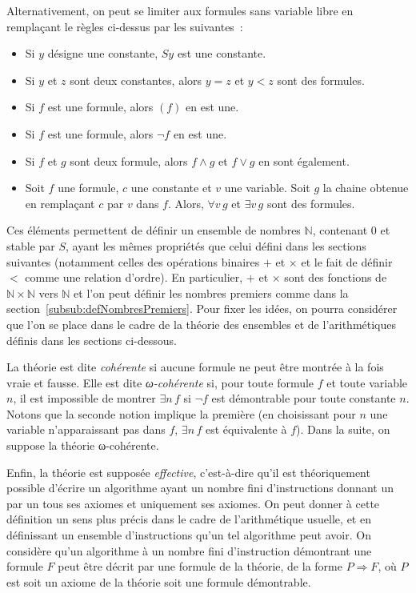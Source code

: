 Alternativement, on peut se limiter aux formules sans variable libre en remplaçant le règles ci-dessus par les suivantes :
\begin{itemize}[nosep]
    \item Si $y$ désigne une constante, $S y$ est une constante.
    \item Si $y$ et $z$ sont deux constantes, alors $y = z$ et $y < z$ sont des formules.
    \item Si $f$ est une formule, alors $(f)$ en est une. 
    \item Si $f$ est une formule, alors $\neg f$ en est une. 
    \item Si $f$ et $g$ sont deux formule, alors $f \wedge g$ et $f \vee g$ en sont également. 
    \item Soit $f$ une formule, $c$ une constante et $v$ une variable. 
        Soit $g$ la chaine obtenue en remplaçant $c$ par $v$ dans $f$.
        Alors, $\forall v \, g$ et $\exists v \, g$ sont des formules.
\end{itemize}
Ces éléments permettent de définir un ensemble de nombres $\mathbb{N}$, contenant $0$ et stable par $S$, ayant les mêmes propriétés que celui défini dans les sections suivantes (notamment celles des opérations binaires $+$ et $\times$ et le fait de définir $<$ comme une relation d'ordre). 
En particulier, $+$ et $\times$ sont des fonctions de $\mathbb{N} \times \mathbb{N}$ vers $\mathbb{N}$ et l'on peut définir les nombres premiers comme dans la section~\ref{subsub:defNombresPremiers}. 
Pour fixer les idées, on pourra considérer que l'on se place dans le cadre de la théorie des ensembles et de l'arithmétiques définis dans les sections ci-dessous.

La théorie est dite \emph{cohérente} si aucune formule ne peut être montrée à la fois vraie et fausse. 
Elle est dite \emph{ω-cohérente} si, pour toute formule $f$ et toute variable $n$, il est impossible de montrer $\exists n \, f$ si $\neg f$ est démontrable pour toute constante $n$. 
Notons que la seconde notion implique la première (en choisissant pour $n$ une variable n'apparaissant pas dans $f$, $\exists n \, f$ est équivalente à $f$).
Dans la suite, on suppose la théorie ω-cohérente.

Enfin, la théorie est supposée \textit{effective}, c'est-à-dire qu'il est théoriquement possible d'écrire un algorithme ayant un nombre fini d'instructions donnant un par un tous ses axiomes et uniquement ses axiomes. 
On peut donner à cette définition un sens plus précis dans le cadre de l'arithmétique usuelle, et en définissant un ensemble d'instructions qu'un tel algorithme peut avoir. 
On considère qu'un algorithme à un nombre fini d'instruction démontrant une formule $F$ peut être décrit par une formule de la théorie, de la forme $P \Rightarrow F$, où $P$ est soit un axiome de la théorie soit une formule démontrable.

